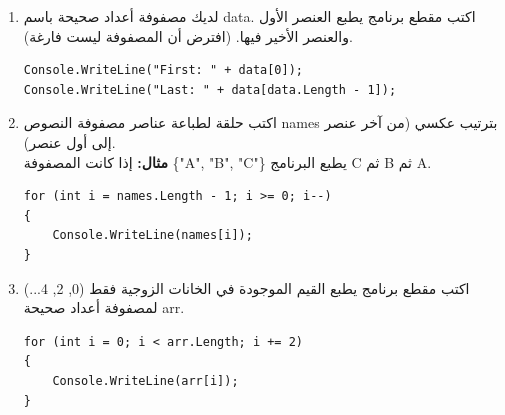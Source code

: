 \documentclass[14pt]{extarticle}
\begin{document}
\begin{enumerate}[itemsep=2em]
    \item
    لديك مصفوفة أعداد صحيحة باسم \textenglish{data}. اكتب مقطع برنامج يطبع العنصر الأول والعنصر الأخير فيها. (افترض أن المصفوفة ليست فارغة).
    \ifwithsols
    \begin{boxSolution}
    \begin{english}
    \begin{verbatim}
Console.WriteLine("First: " + data[0]);
Console.WriteLine("Last: " + data[data.Length - 1]);
    \end{verbatim}
    \end{english}
    \end{boxSolution}
    \fi

    \item
    اكتب حلقة لطباعة عناصر مصفوفة النصوص \textenglish{names} بترتيب عكسي (من آخر عنصر إلى أول عنصر).\\
    \textbf{مثال:} إذا كانت المصفوفة \textenglish{\{"A", "B", "C"\}} يطبع البرنامج \textenglish{C} ثم \textenglish{B} ثم \textenglish{A}.
    \ifwithsols
    \begin{boxSolution}
    \begin{english}
    \begin{verbatim}
for (int i = names.Length - 1; i >= 0; i--)
{
    Console.WriteLine(names[i]);
}
    \end{verbatim}
    \end{english}
    \end{boxSolution}
    \fi

    \item
    اكتب مقطع برنامج يطبع القيم الموجودة في الخانات الزوجية فقط (0, 2, 4...) لمصفوفة أعداد صحيحة \textenglish{arr}.
    \ifwithsols
    \begin{boxSolution}
    \begin{english}
    \begin{verbatim}
for (int i = 0; i < arr.Length; i += 2)
{
    Console.WriteLine(arr[i]);
}
    \end{verbatim}
    \end{english}
    \end{boxSolution}
    \fi


\end{enumerate}
\end{document}

